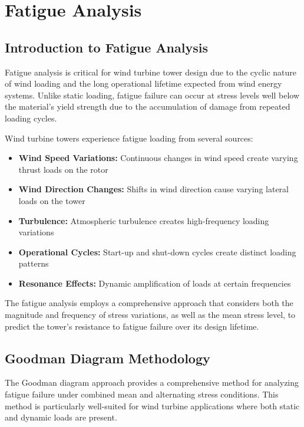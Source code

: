 \documentclass[12pt]{article}
\begin{document}
\section{Fatigue Analysis}

\subsection{Introduction to Fatigue Analysis}

Fatigue analysis is critical for wind turbine tower design due to the cyclic nature of wind loading and the long operational lifetime expected from wind energy systems. Unlike static loading, fatigue failure can occur at stress levels well below the material's yield strength due to the accumulation of damage from repeated loading cycles.

Wind turbine towers experience fatigue loading from several sources:
\begin{itemize}
    \item \textbf{Wind Speed Variations:} Continuous changes in wind speed create varying thrust loads on the rotor
    \item \textbf{Wind Direction Changes:} Shifts in wind direction cause varying lateral loads on the tower
    \item \textbf{Turbulence:} Atmospheric turbulence creates high-frequency loading variations
    \item \textbf{Operational Cycles:} Start-up and shut-down cycles create distinct loading patterns
    \item \textbf{Resonance Effects:} Dynamic amplification of loads at certain frequencies
\end{itemize}

The fatigue analysis employs a comprehensive approach that considers both the magnitude and frequency of stress variations, as well as the mean stress level, to predict the tower's resistance to fatigue failure over its design lifetime.

\subsection{Goodman Diagram Methodology}

The Goodman diagram approach provides a comprehensive method for analyzing fatigue failure under combined mean and alternating stress conditions. This method is particularly well-suited for wind turbine applications where both static and dynamic loads are present.
\end{document}
